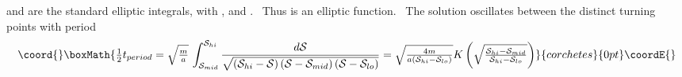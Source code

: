 \documentclass[a4paper,12pt]{article}%
\begin{document}
\coordHE{} and \coordHE{} are the standard elliptic integrals, with\textbf{ }\coordHE{}, and \coordHE{}. \ Thus
\coordHE{} is an elliptic function. \ The solution
oscillates between the distinct turning points \coordHE{} with period%
\[\coord{}\boxMath{
\tfrac{1}{2}t_{period}=\sqrt{\tfrac{m}{a}}\,\int_{\mathcal{S}_{mid}%
}^{\mathcal{S}_{hi}}\frac{d\mathcal{S}}{\sqrt{\left(  \mathcal{S}%
_{hi}-\mathcal{S}\right)  \left(  \mathcal{S}-\mathcal{S}_{mid}\right)
\left(  \mathcal{S}-\mathcal{S}_{lo}\right)  }}=\sqrt{\tfrac{4m}{a\left(
\mathcal{S}_{hi}-\mathcal{S}_{lo}\right)  }}K\left(  \sqrt{\tfrac
{\mathcal{S}_{hi}-\mathcal{S}_{mid}}{\mathcal{S}_{hi}-\mathcal{S}_{lo}}%
}\right)
}{corchetes}{0pt}\coordE{}\]
\end{document}
